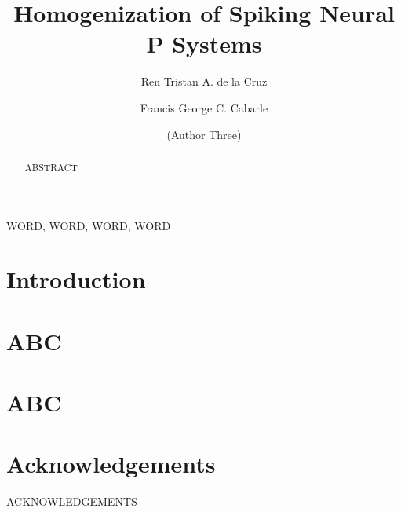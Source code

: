\documentclass[]{elsarticle}
\begin{document}
\begin{frontmatter}


\title{Homogenization of Spiking Neural P Systems}

\author[1]{Ren Tristan A. de la Cruz}
\author[1]{Francis George C. Cabarle}
\author[2]{(Author Three)}

\address[1]
{
Algorithms and Complexity Lab, 
Department of Computer Science, 
University of the Philippines Diliman,
1101, Quezon City, Philippines.
}
\address[2]{(address 2)}


\begin{abstract}
ABSTRACT
\end{abstract}

\begin{keyword}
WORD, WORD, WORD, WORD
\end{keyword}

\end{frontmatter}


\section{Introduction}
\section{ABC}
\section{ABC}
\section*{Acknowledgements}

ACKNOWLEDGEMENTS



 
\end{document}
